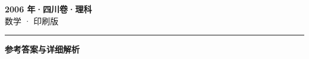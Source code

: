 \documentclass[zihao=5, a4paper]{ctexart}
\begin{document}
\begin{center}
  {\Large\bfseries 2006 年·四川卷·理科}\\[4pt]
  {\large 数学 · 印刷版}
\end{center}
\medskip
{}

\par\bigskip\hrule\bigskip
{}
\begin{center}{\large\bfseries 参考答案与详细解析}\end{center}
\smallskip

\end{document}
